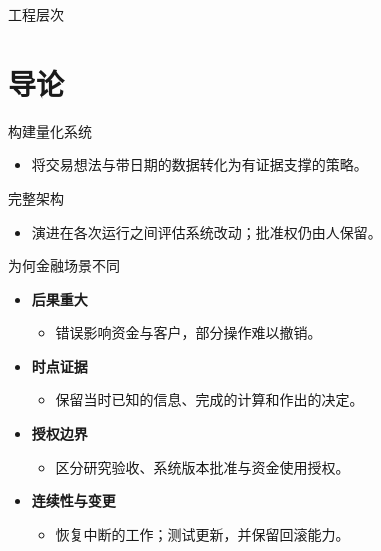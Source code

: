 \begin{frame}{工程层次}
\begin{center}
\resizebox{!}{6.6cm}{}
\end{center}
\end{frame}

\section{导论}
\begin{frame}{构建量化系统}
\begin{center}
\resizebox{.94\textwidth}{!}{}
\end{center}
\begin{itemize}
\item 将交易想法与带日期的数据转化为有证据支撑的策略。
\end{itemize}
\end{frame}

\begin{frame}[t]{完整架构}
\centering
\resizebox{!}{6.0cm}{}
\par\raggedright\smallskip
\begin{itemize}
\item 演进在各次运行之间评估系统改动；批准权仍由人保留。
\end{itemize}
\end{frame}

\begin{frame}{为何金融场景不同}
\begin{itemize}
\item \textbf{后果重大}
\begin{itemize}
\item 错误影响资金与客户，部分操作难以撤销。
\end{itemize}
\item \textbf{时点证据}
\begin{itemize}
\item 保留当时已知的信息、完成的计算和作出的决定。
\end{itemize}
\item \textbf{授权边界}
\begin{itemize}
\item 区分研究验收、系统版本批准与资金使用授权。
\end{itemize}
\item \textbf{连续性与变更}
\begin{itemize}
\item 恢复中断的工作；测试更新，并保留回滚能力。
\end{itemize}
\end{itemize}
\end{frame}


